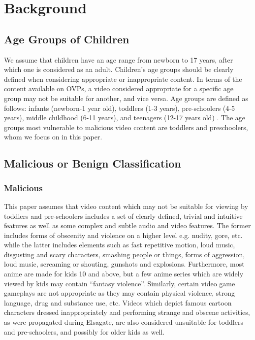 \documentclass[letterpaper]{article}
\begin{document}
\section{Background}\label{BG} 
\subsection{Age Groups of Children}
We assume that children have an age range from newborn to 17 years, after which one is considered as an adult. Children's age groups should be clearly defined when considering appropriate or inappropriate content. In terms of the content available on OVPs, a video considered appropriate for a specific age group may not be suitable for another, and vice versa.  Age groups are defined as follows: infants (newborn-1 year old), toddlers (1-3 years), pre-schoolers (4-5 years), middle childhood (6-11 years), and teenagers (12-17 years old) \cite{cdc_2019_positive}. The age groups most vulnerable to malicious video content are toddlers and preschoolers, whom we focus on in this paper.

\subsection{Malicious or Benign Classification}
\subsubsection{Malicious}
This paper assumes that video content which may not be suitable for viewing by toddlers and pre-schoolers includes a set of clearly defined, trivial and intuitive features as well as some complex and subtle audio and video features. The former includes forms of obscenity and violence on a higher level e.g. nudity, gore, etc. while the latter includes elements such as fast repetitive motion, loud music, disgusting and scary characters, smashing people or things, forms of aggression, loud music, screaming or shouting, gunshots and explosions. Furthermore, most anime are made for kids 10 and above, but a few anime series which are widely viewed by kids may contain ``fantasy violence''. 
 Similarly, certain video game gameplays are not appropriate as they may contain physical violence, strong language, drug and substance use, etc.  Videos which depict famous cartoon characters dressed inappropriately and performing strange and obscene activities, as were propagated during Elsagate, are also considered unsuitable for toddlers and pre-schoolers, and possibly for older kids as well.  
\end{document}
